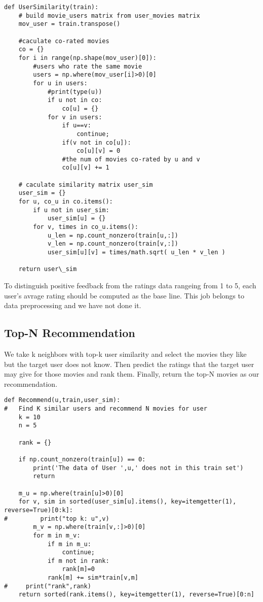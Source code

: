 \documentclass[]{article}
\begin{document}
\begin{lstlisting}
def UserSimilarity(train):
    # build movie_users matrix from user_movies matrix
    mov_user = train.transpose()

    #caculate co-rated movies
    co = {}
    for i in range(np.shape(mov_user)[0]):
        #users who rate the same movie
        users = np.where(mov_user[i]>0)[0]
        for u in users:
            #print(type(u))
            if u not in co:
                co[u] = {}
            for v in users:
                if u==v:
                    continue;
                if(v not in co[u]):
                    co[u][v] = 0
                #the num of movies co-rated by u and v
                co[u][v] += 1

    # caculate similarity matrix user_sim
    user_sim = {}
    for u, co_u in co.items():
        if u not in user_sim:
            user_sim[u] = {}
        for v, times in co_u.items():
            u_len = np.count_nonzero(train[u,:])
            v_len = np.count_nonzero(train[v,:])
            user_sim[u][v] = times/math.sqrt( u_len * v_len )
            
    return user\_sim
\end{lstlisting}

To distinguish positive feedback from the ratings data rangeing from 1 to 5, each user's avrage rating should be computed as the base line. This job belongs to data preprocessing and we have not done it.

\subsection{Top-N Recommendation}
We take k neighbors with top-k user similarity and select the movies they like but the target user does not know. Then predict the ratings that the target user may give for those movies and rank them. Finally, return the top-N movies as our recommendation.

\newpage
\begin{lstlisting}
def Recommend(u,train,user_sim):
#   Find K similar users and recommend N movies for user
    k = 10
    n = 5
    
    rank = {}

    if np.count_nonzero(train[u]) == 0:
        print('The data of User ',u,' does not in this train set')
        return

    m_u = np.where(train[u]>0)[0]
    for v, sim in sorted(user_sim[u].items(), key=itemgetter(1), reverse=True)[0:k]:
#         print("top k: u",v)
        m_v = np.where(train[v,:]>0)[0]
        for m in m_v:
            if m in m_u:
                continue;
            if m not in rank:
                rank[m]=0
            rank[m] += sim*train[v,m]
#     print("rank",rank)
    return sorted(rank.items(), key=itemgetter(1), reverse=True)[0:n]
\end{lstlisting}
\end{document}
